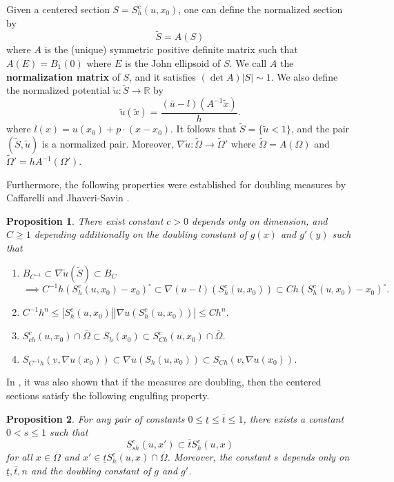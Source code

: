 \documentclass[12pt,reqno]{amsart}
\newtheorem{prop}{Proposition}[section]
\numberwithin{equation}{section}
\begin{document}
Given a centered section $S = S^c_h(u, x_0)$, one can define the normalized section by
\[\tilde S = A(S)\]
where $A$ is the (unique) symmetric positive definite matrix such that $A(E) = B_1(0)$ where $E$ is the John ellipsoid of $S$. We call $A$ the {\bf normalization matrix} of $S$, and it satisfies $(\det A)|S|\sim 1$. We also define the normalized potential $\tilde u:\tilde S\to \mathbb R$ by
\[\tilde u(\tilde x) = \frac{(\bar u-l)(A^{-1}\tilde x)}{h}.\]
where $l(x) = u(x_0)+p\cdot (x-x_0)$. It follows that $\tilde S = \{\tilde u<1\}$, and the pair $(\tilde S, \tilde u)$ is a normalized pair. Moreover, $\nabla \tilde u:\tilde\Omega\to\tilde\Omega'$ where $\tilde\Omega = A(\Omega)$ and $\tilde\Omega' = hA^{-1}(\Omega')$.  

Furthermore, the following properties were established for doubling measures by Caffarelli \cite{Caffarelli2, Caffarelli3} and Jhaveri-Savin \cite{Jhaveri-Savin}. 


\begin{prop}\label{prop: properties-of-sections}\cite[Section 3]{Jhaveri-Savin}
There exist constant $c>0$ depends only on dimension, and $C\geq 1$ depending additionally on the doubling constant of $g(x)$ and $g'(y)$ such that
\begin{enumerate}
    \item $B_{C^{-1}}\subset \nabla\tilde u(\tilde S)\subset B_C$
    \[\implies C^{-1}h(S_h^c(u, x_0)-x_0)^{\circ}\subset \nabla (u-l)(S_h^c(u, x_0))\subset Ch(S_h^c(u, x_0)-x_0)^{\circ}.\]
    \item $C^{-1}h^n\leq|S_h^c(u, x_0)||\nabla u(S_h^c(u, x_0))|\leq Ch^n$. 
    \item $S_{ch}^c(u, x_0)\cap \overline\Omega\subset S_h(x_0)\subset S_{Ch}^c(u, x_0)\cap \overline\Omega$. 
    \item $S_{C^{-1}h}(v, \nabla u(x_0))\subset \nabla u(S_h(u, x_0))\subset S_{Ch}(v, \nabla u(x_0))$. 
\end{enumerate}
\end{prop}

In \cite{Caffarelli3, Jhaveri-Savin}, it was also shown that if the measures are doubling, then the centered sections satisfy the following engulfing property. 
\begin{prop}\cite[Lemma 3.3]{Jhaveri-Savin}\label{prop: engulfing}
For any pair of constants $0\leq \underline{t}\leq \overline t\leq 1$, there exists a constant $0<s\leq 1$ such that
\[S_{sh}^c(u, x')\subset \overline tS_h^c(u, x)\]
for all $x\in \overline\Omega$ and $x'\in \underline{t}S_h^c(u, x)\cap \overline\Omega$. Moreover, the constant $s$ depends only on $\underline{t}, \overline t, n$ and the doubling constant of $g$ and $g'$.
\end{prop}
\end{document}
